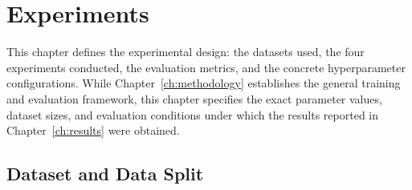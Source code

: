 %
%
%
%
%
\chapter{Experiments}
\label{ch:experiments}

This chapter defines the experimental design: the datasets used, the four experiments conducted, the evaluation metrics, and the concrete hyperparameter configurations. While Chapter~\ref{ch:methodology} establishes the general training and evaluation framework, this chapter specifies the exact parameter values, dataset sizes, and evaluation conditions under which the results reported in Chapter~\ref{ch:results} were obtained.

\section{Dataset and Data Split}
\label{sec:experiments:dataset}

